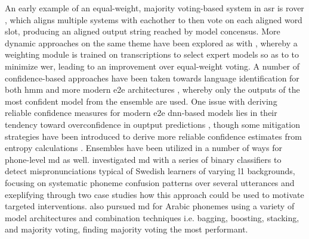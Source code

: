 \documentclass[thesis]{cluu}
\begin{document}
An early example of an equal-weight, majority voting-based system in \gls{asr} is \gls{rover} \parencite{fiscus1997post}, which aligns multiple systems with eachother to then vote on each aligned word slot, producing an aligned output string reached by model concensus. More dynamic approaches on the same theme have been explored as with \textcite{agrawalLearningWhenTrust2023}, whereby a weighting module is trained on transcriptions to select expert models so as to to minimize \gls{wer}, leading to an improvement over equal-weight voting. A number of confidence-based approaches have been taken towards language identification for both \gls{hmm} and more modern \gls{e2e} architectures \textcite{gitmanConfidencebasedEnsemblesEndtoEnd2023}, whereby only the outputs of the most confident model from the ensemble are used. One issue with deriving reliable confidence measures for modern \gls{e2e} \gls{dnn}-based models lies in their tendency toward overconfidence in ouptput predictions \parencite{weiMitigatingNeuralNetwork2022}, though some mitigation strategies have been introduced to derive more reliable confidence estimates from entropy calculations \parencite{laptevFastEntropyBasedMethods2023}. Ensembles have been utilized in a number of ways for phone-level \gls{md} as well. \textcite{ananthakrishnanUsingEnsembleClassifiers2011} investigated \gls{md} with a series of binary classifiers to detect mispronunciations typical of Swedish learners of varying \gls{l1} backgrounds, focusing on systematic phoneme confusion patterns over several utterances and exeplifying through two case studies how this approach could be used to motivate targeted interventions. \textcite{calikEnsemblebasedFrameworkMispronunciation2023} also pursued \gls{md} for Arabic phonemes using a variety of model architectures and combination techniques i.e. bagging, boosting, stacking, and majority voting, finding majority voting the most performant.  
\end{document}
